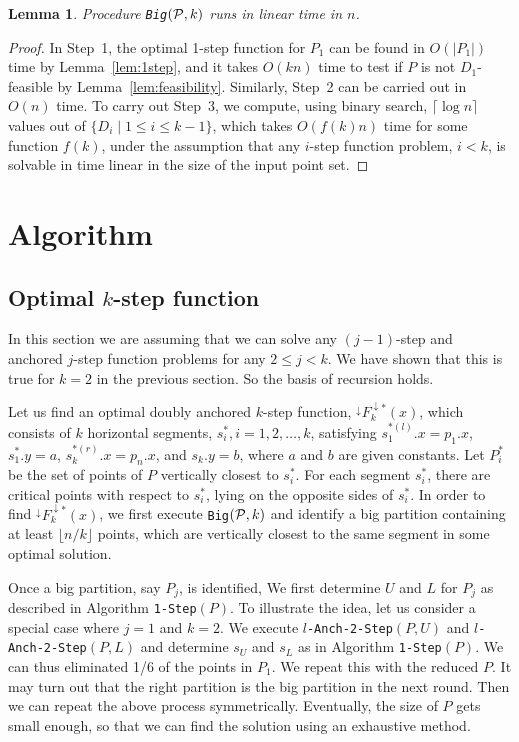 \documentclass[preprint,10pt]{elsarticle}
\newtheorem{lemma}{Lemma}
\begin{document}
\begin{lemma}\label{lem:Bigislinear}
Procedure {\tt Big$({\cal P},k)$} runs in linear time in $n$.
\end{lemma}
\begin{proof}
In Step~1, the optimal 1-step function for $P_1$ can be found in $O(|P_1|)$ time by Lemma~\ref{lem:1step},
and it takes $O(kn)$ time to test if $P$ is not $D_1$-feasible by Lemma~\ref{lem:feasibility}.
Similarly, Step~2 can be carried out in $O(n)$ time.
To carry out Step~3,
we compute, using binary search, $\lceil \log n\rceil$ values out of $\{D_i\mid 1\leq i \leq k-1\}$,
which takes $O(f(k)n)$ time for some function $f(k)$,
under the assumption that any $i$-step function problem, $i < k$,
is solvable in time linear in the size of the input point set.
\end{proof}


\section{Algorithm}\label{sec:algorithm}
\subsection{Optimal $k$-step function}
In this section we are assuming that we can solve any $(j-1)$-step and anchored
$j$-step function problems for any $2\le j <k$.
We have shown that this is true for $k=2$ in the previous section.
So the basis of recursion holds. 

Let us find an optimal doubly anchored $k$-step function, $^{\downarrow}\!F_k^{\downarrow *}(x)$,
which consists of $k$ horizontal segments,
$s_i^*, i=1,2, \ldots, k$,
satisfying $s_1^{*(l)}.x=p_1.x$,  $s_1^*.y=a$,   $s_k^{*(r)}.x = p_n.x$,  and $s_k.y=b$,
where $a$ and $b$ are given constants.
Let $P_i^*$  {be}  the set of points of $P$ vertically closest to $s_i^*$. For each segment $s_i^*$, there are critical points with respect to $s_i^*$, lying on the opposite sides of $s_i^*$.
In order to find $^{\downarrow}\!F_k^{\downarrow *}(x)$, 
we first execute {\tt Big$({\cal P}, k)$}
and identify a big partition containing at least $\lfloor n/k\rfloor$ points,
which are vertically closest to the same segment in some optimal solution.


Once a big partition, say $P_j$, is identified,
We first determine $U$ and $L$ for $P_j$ as described in Algorithm {\tt 1-Step}$(P)$.
To illustrate the idea,
let us consider a special case where $j=1$ and $k=2$.
We execute {\tt $l$-Anch-2-Step}$(P,U)$ and  {\tt $l$-Anch-2-Step}$(P,L)$
and determine $s_U$ and $s_L$ as in  Algorithm {\tt 1-Step}$(P)$.
We can thus eliminated 1/6 of the points in $P_1$.
We repeat this with the reduced $P$.
It may turn out that the right partition is the big partition in the next round.
Then we can repeat the above process symmetrically.
Eventually, the size of $P$ gets small enough,
so that we can find the solution using an exhaustive method.
\end{document}
